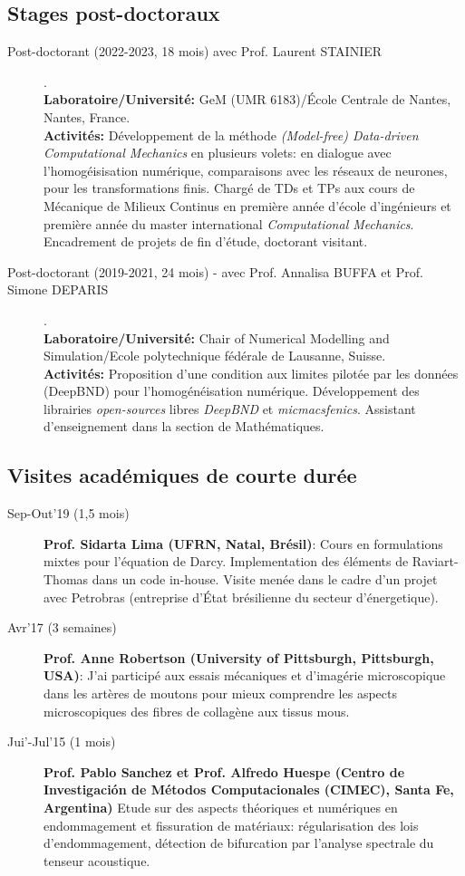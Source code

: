 \documentclass[french]{article}
\begin{document}
\subsection*{Stages post-doctoraux}
\begin{description}
\item[Post-doctorant (2022-2023, 18 mois) avec Prof. Laurent STAINIER].
\\
\textbf{Laboratoire/Université:} GeM (UMR 6183)/École Centrale de Nantes, Nantes, France.\\
\textbf{Activités:} Développement de la méthode \emph{(Model-free) Data-driven Computational Mechanics} en plusieurs volets: en dialogue avec l'homogéisisation numérique, comparaisons avec les réseaux de neurones, pour les transformations finis. Chargé de TDs et TPs aux cours de Mécanique de Milieux Continus en première année d'école d'ingénieurs et première année du master international \emph{Computational Mechanics}. Encadrement de projets de fin d'étude, doctorant visitant.
\item[Post-doctorant (2019-2021, 24 mois) - avec Prof. Annalisa BUFFA et Prof. Simone DEPARIS] . \\
\textbf{Laboratoire/Université:} Chair of Numerical Modelling and Simulation/Ecole polytechnique fédérale de Lausanne, Suisse. \\
\textbf{Activités:}
Proposition d'une condition aux limites pilotée par les données (DeepBND) pour l'homogénéisation numérique. Développement des librairies \emph{open-sources} libres \textit{DeepBND} et \textit{micmacsfenics}. Assistant d'enseignement dans la section de  Mathématiques.   
\end{description}

\subsection*{Visites académiques de courte durée}

\begin{description}
\item[Sep-Out'19 (1,5 mois)] \textbf{Prof. Sidarta Lima (UFRN, Natal, Brésil)}: Cours en formulations mixtes pour l'équation de Darcy. Implementation des éléments de Raviart-Thomas dans un code in-house. Visite menée dans le cadre d'un projet avec Petrobras (entreprise d'État brésilienne du secteur d'énergetique).
\item[Avr'17 (3 semaines)] \textbf{Prof. Anne Robertson (University of Pittsburgh, Pittsburgh, USA)}: J'ai participé aux essais mécaniques et d'imagérie microscopique dans les artères de moutons pour mieux comprendre les aspects microscopiques des fibres de collagène aux tissus mous.
\item[Jui'-Jul'15 (1 mois)] \textbf{Prof. Pablo Sanchez et Prof. Alfredo Huespe (Centro de Investigación de Métodos Computacionales (CIMEC), Santa Fe, Argentina)}{ Etude sur des aspects théoriques et numériques en endommagement et fissuration de matériaux: régularisation des lois d'endommagement, détection de bifurcation par l'analyse spectrale du tenseur acoustique.}
	
\end{description}
\end{document}
